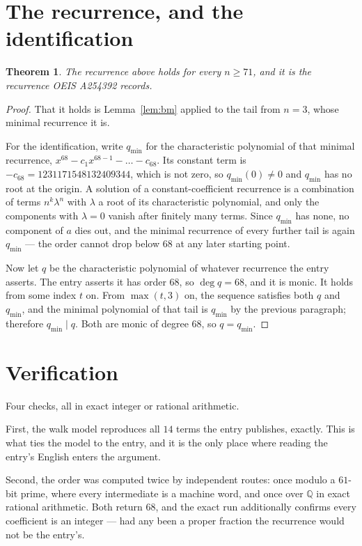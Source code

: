 \documentclass[11pt,a4paper]{article}
\theoremstyle{plain}
\newtheorem{theorem}{Theorem}
\theoremstyle{definition}
\begin{document}
\section{The recurrence, and the identification}

\begin{theorem}
The recurrence above holds for every $n\ge71$, and it is the recurrence OEIS A254392 records.
\end{theorem}

\begin{proof}
That it holds is Lemma~\ref{lem:bm} applied to the tail from $n=3$, whose minimal
recurrence it is.

For the identification, write $q_{\min}$ for the characteristic polynomial of that minimal
recurrence, $x^{68}-c_1x^{68-1}-\dots-c_{68}$. Its constant term is
$-c_{68}=1231171548132409344$, which is not zero, so $q_{\min}(0)\neq0$ and $q_{\min}$ has no
root at the origin. A solution of a constant-coefficient recurrence is a combination of terms
$n^{k}\lambda^{n}$ with $\lambda$ a root of its characteristic polynomial, and only the
components with $\lambda=0$ vanish after finitely many terms. Since $q_{\min}$ has none, no
component of $a$ dies out, and the minimal recurrence of every further tail is again
$q_{\min}$ --- the order cannot drop below $68$ at any later starting point.

Now let $q$ be the characteristic polynomial of whatever recurrence the entry asserts. The
entry asserts it has order $68$, so $\deg q=68$, and it is monic. It holds from some
index $t$ on. From $\max(t,3)$ on, the sequence satisfies both $q$ and $q_{\min}$, and
the minimal polynomial of that tail is $q_{\min}$ by the previous paragraph; therefore
$q_{\min}\mid q$. Both are monic of degree $68$, so $q=q_{\min}$.
\end{proof}

\section{Verification}

Four checks, all in exact integer or rational arithmetic.

First, the walk model reproduces all $14$ terms the entry publishes, exactly. This is
what ties the model to the entry, and it is the only place where reading the entry's English
enters the argument.

Second, the order was computed twice by independent routes: once modulo a $61$-bit prime, where
every intermediate is a machine word, and once over $\mathbb{Q}$ in exact rational arithmetic.
Both return $68$, and the exact run additionally confirms every coefficient is an integer
--- had any been a proper fraction the recurrence would not be the entry's.
\end{document}
